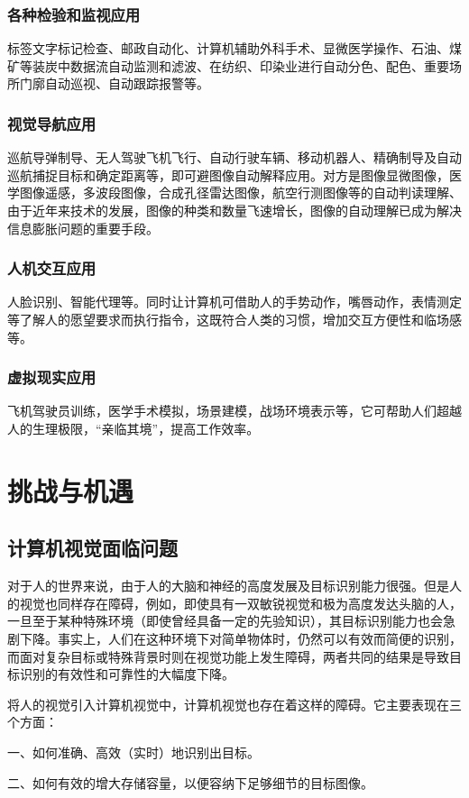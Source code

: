 {\subsection{各种检验和监视应用}
标签文字标记检查、邮政自动化、计算机辅助外科手术、显微医学操作、石油、煤矿等装炭中数据流自动监测和滤波、在纺织、印染业进行自动分色、配色、重要场所门廓自动巡视、自动跟踪报警等。
\subsection{视觉导航应用}
巡航导弹制导、无人驾驶飞机飞行、自动行驶车辆、移动机器人、精确制导及自动巡航捕捉目标和确定距离等，即可避图像自动解释应用。对方是图像显微图像，医学图像遥感，多波段图像，合成孔径雷达图像，航空行测图像等的自动判读理解、由于近年来技术的发展，图像的种类和数量飞速增长，图像的自动理解已成为解决信息膨胀问题的重要手段。
\subsection{人机交互应用}
人脸识别、智能代理等。同时让计算机可借助人的手势动作，嘴唇动作，表情测定等了解人的愿望要求而执行指令，这既符合人类的习惯，增加交互方便性和临场感等。
\subsection{虚拟现实应用}
飞机驾驶员训练，医学手术模拟，场景建模，战场环境表示等，它可帮助人们超越人的生理极限，“亲临其境”，提高工作效率。

\chapter{挑战与机遇}
\section{ 计算机视觉面临问题 }
对于人的世界来说，由于人的大脑和神经的高度发展及目标识别能力很强。但是人的视觉也同样存在障碍，例如，即使具有一双敏锐视觉和极为高度发达头脑的人，一旦至于某种特殊环境（即使曾经具备一定的先验知识），其目标识别能力也会急剧下降。事实上，人们在这种环境下对简单物体时，仍然可以有效而简便的识别，而面对复杂目标或特殊背景时则在视觉功能上发生障碍，两者共同的结果是导致目标识别的有效性和可靠性的大幅度下降。

将人的视觉引入计算机视觉中，计算机视觉也存在着这样的障碍\citep{Zhao.2012}。它主要表现在三个方面：

一、如何准确、高效（实时）地识别出目标。

二、如何有效的增大存储容量，以便容纳下足够细节的目标图像。

}
